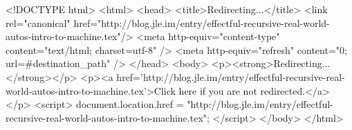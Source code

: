 <!DOCTYPE html>
<html>
<head>
<title>Redirecting...</title>
<link rel="canonical" href="http://blog.jle.im/entry/effectful-recursive-real-world-autos-intro-to-machine.tex"/>
<meta http-equiv="content-type" content="text/html; charset=utf-8" />
<meta http-equiv="refresh" content="0; url=#{destination_path}" />
</head>
<body>
  <p><strong>Redirecting...</strong></p>
  <p><a href='http://blog.jle.im/entry/effectful-recursive-real-world-autos-intro-to-machine.tex'>Click here if you are not redirected.</a></p>
  <script>
    document.location.href = "http://blog.jle.im/entry/effectful-recursive-real-world-autos-intro-to-machine.tex";
  </script>
</body>
</html>
